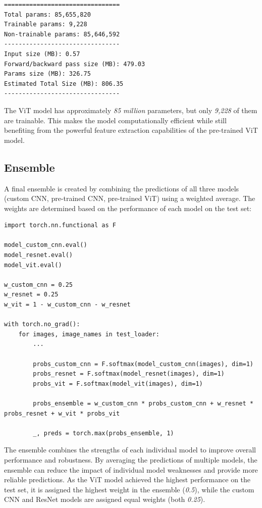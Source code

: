 \begin{minipage}{0.9\linewidth}\begin{lstlisting}[language={},caption={Pre-trained ViT model summary.},label={lst:pre-trained-vit-summary}]
================================
Total params: 85,655,820
Trainable params: 9,228
Non-trainable params: 85,646,592
--------------------------------
Input size (MB): 0.57
Forward/backward pass size (MB): 479.03
Params size (MB): 326.75
Estimated Total Size (MB): 806.35
--------------------------------
\end{lstlisting}\end{minipage}

The ViT model has approximately \textit{85 million} parameters, but only \textit{9,228} of them are trainable. This makes the model computationally efficient while still benefiting from the powerful feature extraction capabilities of the pre-trained ViT model.

\subsection{Ensemble}

A final ensemble is created by combining the predictions of all three models (custom CNN, pre-trained CNN, pre-trained ViT) using a weighted average. The weights are determined based on the performance of each model on the test set:

\begin{minipage}{0.9\linewidth}\begin{lstlisting}[caption={Ensemble predictions using a weighted average.},label={lst:ensemble}]
import torch.nn.functional as F

model_custom_cnn.eval()
model_resnet.eval()
model_vit.eval()

w_custom_cnn = 0.25
w_resnet = 0.25
w_vit = 1 - w_custom_cnn - w_resnet

with torch.no_grad():
    for images, image_names in test_loader:
        ...

        probs_custom_cnn = F.softmax(model_custom_cnn(images), dim=1)
        probs_resnet = F.softmax(model_resnet(images), dim=1)
        probs_vit = F.softmax(model_vit(images), dim=1)

        probs_ensemble = w_custom_cnn * probs_custom_cnn + w_resnet * probs_resnet + w_vit * probs_vit

        _, preds = torch.max(probs_ensemble, 1)
\end{lstlisting}\end{minipage}

The ensemble combines the strengths of each individual model to improve overall performance and robustness. By averaging the predictions of multiple models, the ensemble can reduce the impact of individual model weaknesses and provide more reliable predictions. As the ViT model achieved the highest performance on the test set, it is assigned the highest weight in the ensemble (\textit{0.5}), while the custom CNN and ResNet models are assigned equal weights (both \textit{0.25}).